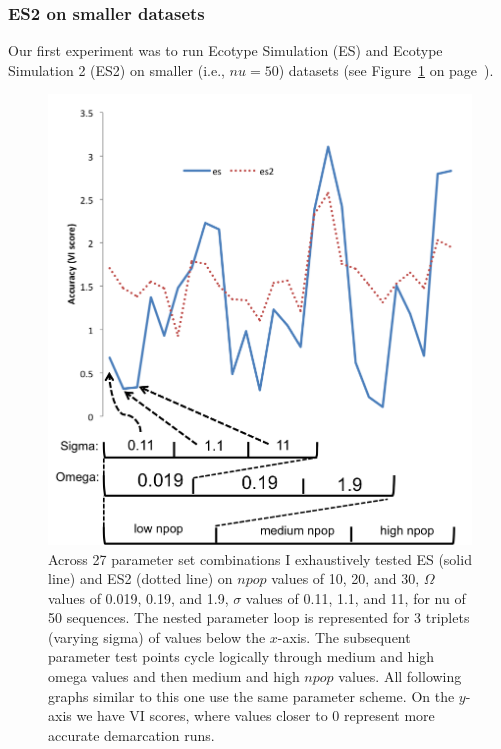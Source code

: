 \subsubsection*{ES2 on smaller datasets}
Our first experiment was to run Ecotype Simulation (ES) and Ecotype Simulation 2 (ES2) on smaller (i.e., $nu = 50$) datasets (see Figure~\ref{fig:ESvES2} on page~\pageref{fig:ESvES2}).
\begin{figure}[h!]
  \centering
    \includegraphics[scale=0.75]{images/ResultGraphs/ResultGraphs-4}
      \caption[ES vs ES2 accuracy visualization on $nu = 50$.]{Across 27 parameter set combinations I exhaustively tested ES (solid line) and ES2 (dotted line) on $npop$ values of 10, 20, and 30, $\Omega$ values of 0.019, 0.19, and 1.9, $\sigma$ values of 0.11, 1.1, and 11, for nu of 50 sequences. The nested parameter loop is represented for 3 triplets (varying sigma) of values below the $x$-axis. The subsequent parameter test points cycle logically through medium and high omega values and then medium and high $npop$ values. All following graphs similar to this one use the same parameter scheme. On the $y$-axis we have VI scores, where values closer to 0 represent more accurate demarcation runs.}
    \label{fig:ESvES2}
\end{figure}
